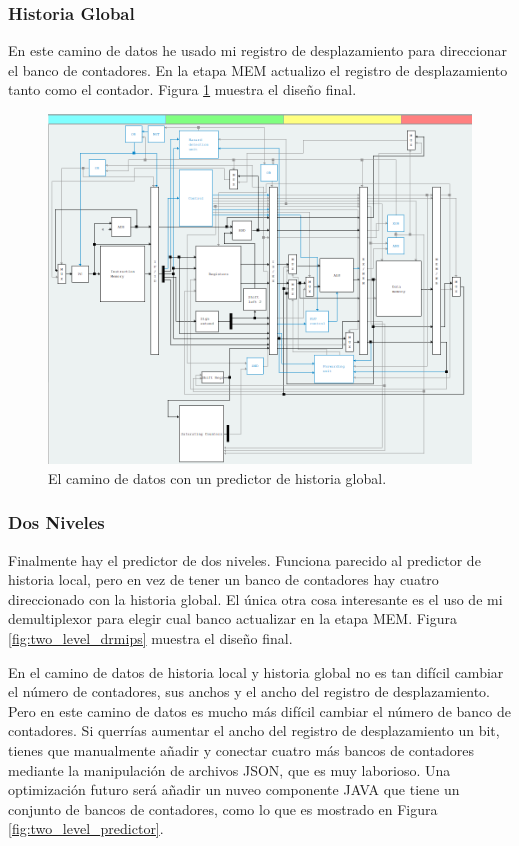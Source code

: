 \documentclass[a4paper]{article}
\begin{document}
\subsubsection{Historia Global}

En este camino de datos he usado mi registro de desplazamiento para direccionar el banco de contadores. En la etapa MEM actualizo el registro de desplazamiento tanto como el contador. Figura \ref{fig:global_history_drmips} muestra el diseño final.

\begin{figure}[!htb]
\centering
\includegraphics[scale=0.4]{./img/global_history_drmips}
\caption{El camino de datos con un predictor de historia global.}
\label{fig:global_history_drmips}
\end{figure}

\subsubsection{Dos Niveles}

Finalmente hay el predictor de dos niveles. Funciona parecido al predictor de historia local, pero en vez de tener un banco de contadores hay cuatro direccionado con la historia global. El única otra cosa interesante es el uso de mi demultiplexor para elegir cual banco actualizar en la etapa MEM. Figura \ref{fig:two_level_drmips} muestra el diseño final.

En el camino de datos de historia local y historia global no es tan difícil cambiar el número de contadores, sus anchos y el ancho del registro de desplazamiento. Pero en este camino de datos es mucho más difícil cambiar el número de banco de contadores. Si querrías aumentar el ancho del registro de desplazamiento un bit, tienes que manualmente añadir y conectar cuatro más bancos de contadores mediante la manipulación de archivos JSON, que es muy laborioso. Una optimización futuro será añadir un nuveo componente JAVA que tiene un conjunto de bancos de contadores, como lo que es mostrado en Figura \ref{fig:two_level_predictor}.
\end{document}
